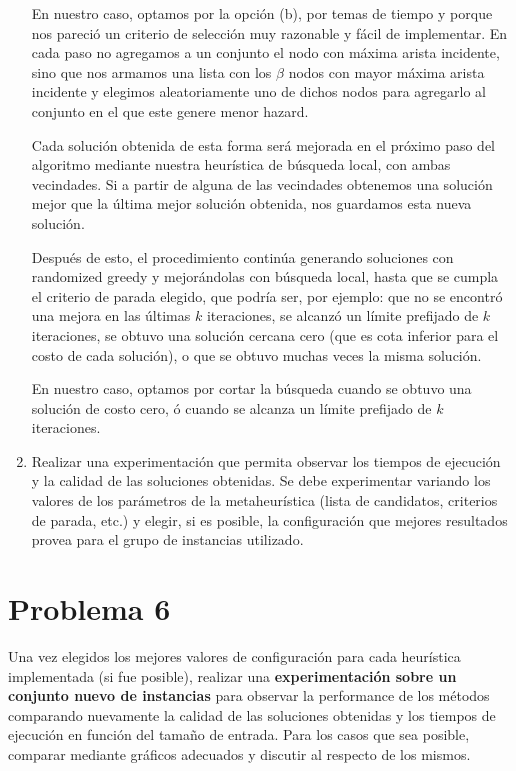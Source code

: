 \documentclass[11pt, a4paper, twoside]{article}
\begin{document}
\begin{enumerate}
			  En nuestro caso, optamos por la opción (b), por temas de tiempo y porque nos pareció un criterio de selección muy
			  razonable y fácil de implementar. En cada paso no agregamos a un conjunto
			  el nodo con máxima arista incidente, sino que nos armamos una lista con los $\beta$ nodos con mayor máxima arista
			  incidente y elegimos aleatoriamente uno de dichos nodos para agregarlo al conjunto en el que
			  este genere menor hazard.
			  
			  Cada solución obtenida de esta forma será mejorada en el próximo paso del algoritmo mediante 
			  nuestra heurística de búsqueda local, con ambas vecindades. 
			  Si a partir de alguna de las vecindades obtenemos una solución mejor que la última mejor solución obtenida, 
			  nos guardamos esta nueva solución.
			  
			  Después de esto, el procedimiento continúa generando soluciones con randomized greedy y mejorándolas con búsqueda local,
			  hasta que se cumpla el criterio de parada elegido, que podría ser, por ejemplo: que no se 
			  encontró una mejora en las últimas $k$ iteraciones, se alcanzó un límite prefijado de $k$ iteraciones, se obtuvo
			  una solución cercana cero (que es cota inferior para el costo de cada solución), o que se obtuvo muchas 
			  veces la misma solución.
			  
			  En nuestro caso, optamos por cortar la búsqueda cuando se obtuvo una solución de costo cero, ó cuando se alcanza un límite
			  prefijado de $k$ iteraciones.
			  
			  
		\item Realizar una experimentación que permita observar los tiempos de ejecución y la calidad de las soluciones
			  obtenidas. Se debe experimentar variando los valores de los parámetros de la metaheurística (lista de candidatos,
			  criterios de parada, etc.) y elegir, si es posible, la configuración que mejores resultados provea para el
			  grupo de instancias utilizado.
			  
	 \end{enumerate}



\newpage
\section{Problema 6}
	Una vez elegidos los mejores valores de configuración para cada heurística implementada (si fue posible), realizar
	una \textbf{experimentación sobre un conjunto nuevo de instancias} para observar la performance de los métodos comparando
	nuevamente la calidad de las soluciones obtenidas y los tiempos de ejecución en función del tamaño de entrada. Para
	los casos que sea posible, comparar mediante gráficos adecuados y discutir al respecto de los mismos.


\end{document}
